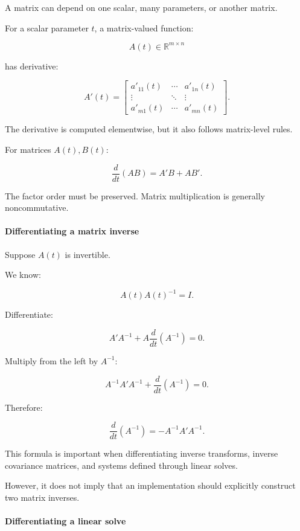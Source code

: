 A matrix can depend on one scalar, many parameters, or another matrix.

For a scalar parameter \(t\), a matrix-valued function:

\[
A(t)\in\mathbb R^{m\times n}
\]

has derivative:

\[
\boxed{ A'(t)= \begin{bmatrix} a'_{11}(t)&\cdots&a'_{1n}(t)\\ \vdots&\ddots&\vdots\\ a'_{m1}(t)&\cdots&a'_{mn}(t) \end{bmatrix} }.
\]

The derivative is computed elementwise, but it also follows matrix-level rules.

For matrices \(A(t),B(t)\):

\[
\boxed{ \frac d{dt}(AB)=A'B+AB' }.
\]

The factor order must be preserved. Matrix multiplication is generally noncommutative.

\paragraph{Differentiating a matrix inverse}\label{02-foundations-ii-ch027-differentiating-a-matrix-inverse}

\hypertarget{02-foundations-ii-ch027-differentiating-a-matrix-inverse}{}

Suppose \(A(t)\) is invertible.

We know:

\[
A(t)A(t)^{-1}=I.
\]

Differentiate:

\[
A'A^{-1} + A\frac d{dt}(A^{-1}) =0.
\]

Multiply from the left by \(A^{-1}\):

\[
A^{-1}A'A^{-1} + \frac d{dt}(A^{-1}) =0.
\]

Therefore:

\[
\boxed{ \frac d{dt}(A^{-1}) = -A^{-1}A'A^{-1} }.
\]

This formula is important when differentiating inverse transforms, inverse covariance matrices, and systems defined through linear solves.

However, it does not imply that an implementation should explicitly construct two matrix inverses.

\paragraph{Differentiating a linear solve}\label{02-foundations-ii-ch027-differentiating-a-linear-solve}

